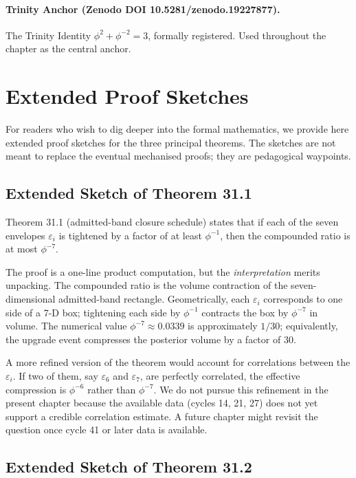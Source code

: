 \paragraph{Trinity Anchor (Zenodo DOI 10.5281/zenodo.19227877).} The Trinity Identity $\phi^{2} + \phi^{-2} = 3$, formally registered. Used throughout the chapter as the central anchor.

\section{Extended Proof Sketches}
\label{sec:31-extended-proof-sketches}

For readers who wish to dig deeper into the formal mathematics, we provide here extended proof sketches for the three principal theorems. The sketches are not meant to replace the eventual mechanised proofs; they are pedagogical waypoints.

\subsection{Extended Sketch of Theorem 31.1}
\label{sec:31-sketch-31-1}

Theorem 31.1 (admitted-band closure schedule) states that if each of the seven envelopes $\varepsilon_{i}$ is tightened by a factor of at least $\phi^{-1}$, then the compounded ratio is at most $\phi^{-7}$.

The proof is a one-line product computation, but the \emph{interpretation} merits unpacking. The compounded ratio is the volume contraction of the seven-dimensional admitted-band rectangle. Geometrically, each $\varepsilon_{i}$ corresponds to one side of a 7-D box; tightening each side by $\phi^{-1}$ contracts the box by $\phi^{-7}$ in volume. The numerical value $\phi^{-7} \approx 0.0339$ is approximately $1/30$; equivalently, the upgrade event compresses the posterior volume by a factor of 30.

A more refined version of the theorem would account for correlations between the $\varepsilon_{i}$. If two of them, say $\varepsilon_{6}$ and $\varepsilon_{7}$, are perfectly correlated, the effective compression is $\phi^{-6}$ rather than $\phi^{-7}$. We do not pursue this refinement in the present chapter because the available data (cycles 14, 21, 27) does not yet support a credible correlation estimate. A future chapter might revisit the question once cycle 41 or later data is available.

\subsection{Extended Sketch of Theorem 31.2}
\label{sec:31-sketch-31-2}

